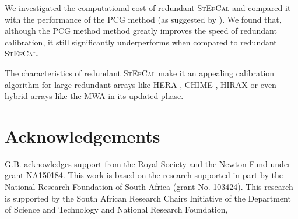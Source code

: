 \documentclass[useAMS,usenatbib]{mn2e}
\begin{document}
We investigated the computational cost of redundant \textsc{StEfCal} and compared it with the performance of the PCG method (as suggested by \cite{Liu2010}).
We found that, although the PCG method method greatly improves the speed of redundant calibration, it still significantly underperforms when compared to redundant \textsc{StEfCal}.

The characteristics of redundant \textsc{StEfCal} make it an appealing calibration algorithm for large redundant arrays like HERA \citep{deboer2017}, CHIME \citep{Bandura2014}, HIRAX \citep{Newburgh2016} or even hybrid arrays like the MWA \citep{Tingay2013} in its updated phase.

\section*{Acknowledgements}
G.B. acknowledges support from the Royal Society and the Newton Fund under grant NA150184. This work is based on the research supported in part by the National Research Foundation of South Africa (grant No. 103424). This research is supported by the South African Research Chairs Initiative of the Department of Science and Technology and National Research Foundation,






\appendix
\end{document}
